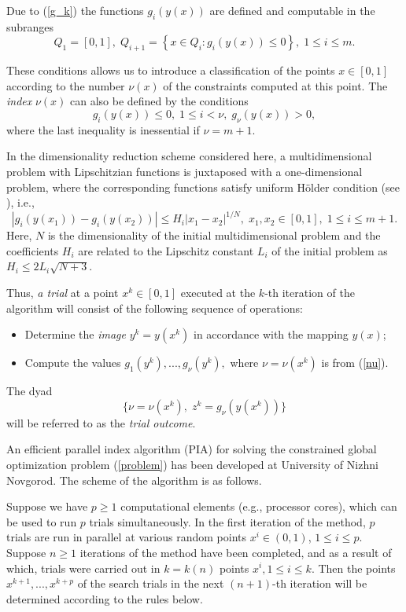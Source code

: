 \documentclass{llncs}
\begin{document}
Due to (\ref{g_k}) the functions $g_i(y(x))$ are defined 
and computable in the subranges 
\[
Q_1=[0,1], \; Q_{i+1}=\left\{x \in Q_i : g_i(y(x)) \leq 0 \right\}, \; 1 \leq i \leq m.
\]

These conditions allows us to introduce a classification of the points $x \in [0,1]$ according to 
the number $\nu (x)$ of the constraints computed at this point. The \textit{index} $\nu(x)$ can 
also be defined by the conditions
\begin{equation}\label{nu}
g_i(y(x)) \leq 0, \; 1 \leq i < \nu, \; g_\nu(y(x))>0,
\end{equation}
where the last inequality is inessential if $\nu=m+1$.

In the dimensionality reduction scheme considered here, a multidimensional problem with 
Lipschitzian functions is juxtaposed with a one-dimensional problem, where the corresponding 
functions satisfy uniform H{\"o}lder condition (see \cite{Strongin2013}), i.e.,
\[
\left|g_i(y(x_1))-g_i (y(x_2))\right| \leq H_i \left|x_1-x_2 \right|^{1/N}, \; x_1,x_2\in [0,1], \; 
1\leq i \leq m+1.
\]
Here, $N$ is the dimensionality of the initial multidimensional problem and the coefficients 
$H_i$ are related to the Lipschitz constant $L_i$ of the initial problem as $H_i \leq 2L_i 
\sqrt{N+3}$.

Thus, \textit{a trial} at a point $x^k \in [0,1]$ executed at the $k$-th iteration of the algorithm 
will consist of the following sequence of operations:
\begin{itemize}
	\item Determine the \textit{image} $y^k=y(x^k)$ in accordance with the mapping 
$y(x)$;
	\item Compute the values $g_1(y^k),..., g_\nu(y^k),$ where $\nu = \nu(x^k)$ is from 
(\ref{nu}). 
\end{itemize}
The dyad 
\begin{equation} \label{trial_result}
 \{ \nu=\nu(x^k), \; z^k=g_\nu(y(x^k)) \} 
\end{equation}
will be referred to as the \textit{trial outcome}.

An efficient parallel index algorithm (PIA) for solving the constrained global optimization 
problem (\ref{problem}) has been developed at University of Nizhni Novgorod. The scheme of 
the algorithm is as follows.

Suppose we have $p \geq 1$  computational elements (e.g., processor cores), which can be 
used to run $p$ trials simultaneously. In the first iteration of the method, $p$ trials are run in 
parallel at various random points $x^i\in(0,1)$, $1\leq i \leq p$. 
Suppose $n \geq 1$  iterations of the method have been completed, and as a result of which, 
trials were carried out in $k=k(n)$ points $x^i, 1\leq i \leq k$. Then the points 
$x^{k+1},...,x^{k+p}$  of the search trials in the next $(n+1)$-th iteration will be determined 
according to the rules below.
\end{document}
